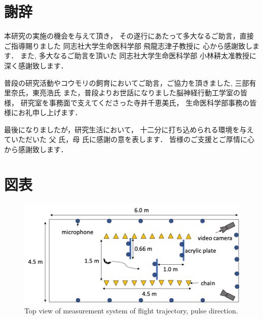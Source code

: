 \documentclass{jsreport}
\begin{document}
\chapter*{謝辞}
\label{sec:謝辞}
本研究の実施の機会を与えて頂き，
その遂行にあたって多大なるご助言，直接ご指導賜りました
同志社大学生命医科学部 飛龍志津子教授に
心から感謝致します．
また, 多大なるご助言を頂いた
同志社大学生命医科学部 小林耕太准教授に深く感謝致します．

普段の研究活動やコウモリの飼育においてご助言，ご協力を頂きました,
三部有里奈氏，東亮浩氏
また，普段よりお世話になりました脳神経行動工学室の皆様，
研究室を事務面で支えてくださった寺井千恵美氏，
生命医科学部事務の皆様にお礼申し上げます．

最後になりましたが，研究生活において，
十二分に打ち込められる環境を与えていただいた
父 氏，母 氏に感謝の意を表します．
皆様のご支援とご厚情に心から感謝致します．

\newpage
\chapter*{図表}


\renewcommand{\figurename}{Fig. } %
\renewcommand{\tablename}{Table } %

\makeatletter
{}
\makeatother

\def\thefigure{\arabic{figure}}
\def\thetable{\arabic{table}}


\begin{figure}[H]
  \centering
  \includegraphics[width=15cm]{figures/top_view_measure.png}
  \caption{
    Top view of measurement system of flight trajectory,
    pulse direction.
  }
  \label{fig:top_view_measure}
\end{figure}
\end{document}
